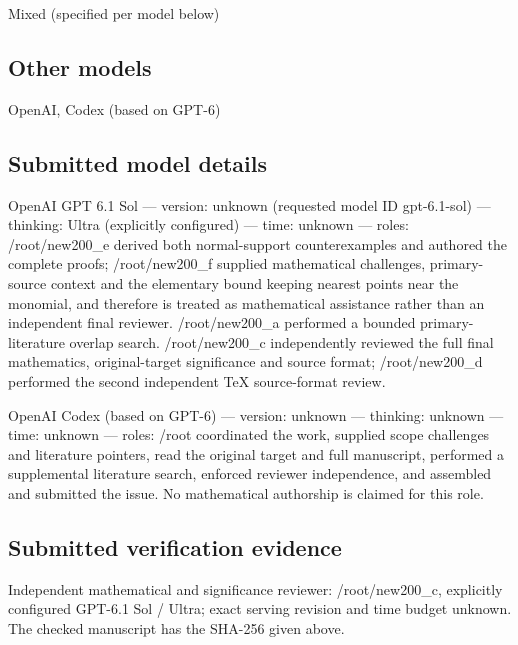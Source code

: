 \documentclass[11pt]{article}
\begin{document}
Mixed (specified per model below)

\subsection{Other models}

OpenAI, Codex (based on GPT-6)

\subsection{Submitted model details}

OpenAI GPT 6.1 Sol  —  version: unknown (requested model ID gpt-6.1-sol)  —  thinking: Ultra (explicitly configured)  —  time: unknown  —  roles: /root/new200\_e derived both normal-support counterexamples and authored the complete proofs; /root/new200\_f supplied mathematical challenges, primary-source context and the elementary bound keeping nearest points near the monomial, and therefore is treated as mathematical assistance rather than an independent final reviewer. /root/new200\_a performed a bounded primary-literature overlap search. /root/new200\_c independently reviewed the full final mathematics, original-target significance and source format; /root/new200\_d performed the second independent TeX source-format review.

OpenAI Codex (based on GPT-6)  —  version: unknown  —  thinking: unknown  —  time: unknown  —  roles: /root coordinated the work, supplied scope challenges and literature pointers, read the original target and full manuscript, performed a supplemental literature search, enforced reviewer independence, and assembled and submitted the issue. No mathematical authorship is claimed for this role.

\subsection{Submitted verification evidence}

Independent mathematical and significance reviewer: /root/new200\_c, explicitly configured GPT-6.1 Sol / Ultra; exact serving revision and time budget unknown. The checked manuscript has the SHA-256 given above.
\end{document}
